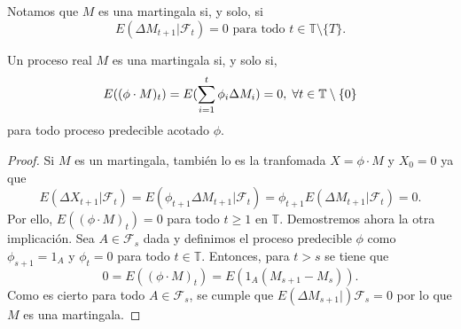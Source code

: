 Notamos que $ M $ es una martingala si, y solo, si
\[
E(\Delta M_{t+1} |\mathcal{F}_t ) = 0 \text{ para todo } t\in \mathbb{T}\setminus\{T\}.
\]

\begin{teoremaBox}\label{2.3.5}
	Un proceso real $ M $ es una martingala si, y solo si, 
	\[
	E((\phi \cdot M)_t) = E(\sum_{i=1}^{t}\phi_i\Delta M_i) = 0, \hspace{1mm} \forall t \in \mathbb{T}\setminus\{0\}
	\]
	para todo proceso predecible acotado $ \phi $.
\end{teoremaBox}
\begin{proof}
	Si $ M $ es un martingala, también lo es la tranfomada $ X = \phi \cdot M $ y $ X_0 =0 $ ya que
	\[
	E(\Delta X_{t+1}|\mathcal{F}_t) = E(\phi_{t+1}\Delta M_{t+1}|\mathcal{F}_t) =  \phi_{t+1} E(\Delta M_{t+1}|\mathcal{F}_t) = 0.
	\] 
	Por ello, $ E((\phi \cdot M)_t) = 0 $ para todo $ t \geq 1 $ en $ \mathbb{T} $.
	Demostremos ahora la otra implicación. Sea $ A \in \mathcal{F}_s $ dada y definimos el proceso predecible $ \phi $ como $ \phi_{s+1} = 1_A $ y $ \phi_t = 0 $ para todo $ t\in \mathbb{T} $. Entonces, para $ t > s $ se tiene que
	\[
	0 = E((\phi \cdot M)_t) = E(1_A(M_{s+1}-M_s)).
	\]
	Como es cierto para todo $ A \in \mathcal{F}_s $, se cumple que $ E(\Delta M_{s+1} | )\mathcal{F}_s = 0 $ por lo que $ M $ es una martingala.
\end{proof}

